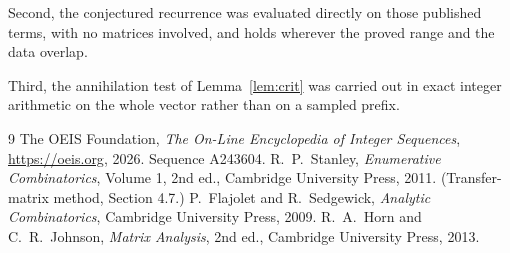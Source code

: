 \documentclass[11pt,a4paper]{article}
\theoremstyle{plain}
\theoremstyle{definition}
\begin{document}
Second, the conjectured recurrence was evaluated directly on those published terms, with no
matrices involved, and holds wherever the proved range and the data overlap.

Third, the annihilation test of Lemma~\ref{lem:crit} was carried out in exact integer
arithmetic on the whole vector rather than on a sampled prefix.

\begin{thebibliography}{9}
 The OEIS Foundation, \emph{The On-Line Encyclopedia of Integer
Sequences}, \url{https://oeis.org}, 2026. Sequence A243604.
 R.~P.~Stanley, \emph{Enumerative Combinatorics}, Volume 1, 2nd ed.,
Cambridge University Press, 2011. (Transfer-matrix method, Section 4.7.)
 P.~Flajolet and R.~Sedgewick, \emph{Analytic Combinatorics}, Cambridge
University Press, 2009.
 R.~A.~Horn and C.~R.~Johnson, \emph{Matrix Analysis}, 2nd ed., Cambridge
University Press, 2013.
\end{thebibliography}
\end{document}
